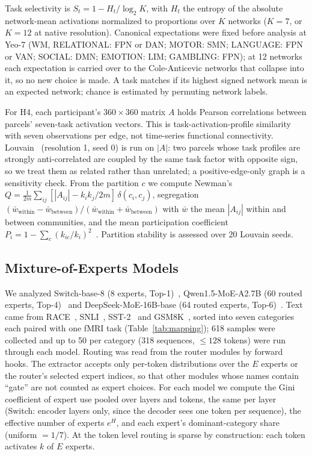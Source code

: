 \documentclass[conference]{IEEEtran}
\begin{document}
Task selectivity is $S_t = 1 - H_t/\log_2 K$, with $H_t$ the entropy of the absolute network-mean activations normalized to proportions over $K$ networks ($K = 7$, or $K = 12$ at native resolution). Canonical expectations were fixed before analysis at Yeo-7 (WM, RELATIONAL: FPN or DAN; MOTOR: SMN; LANGUAGE: FPN or VAN; SOCIAL: DMN; EMOTION: LIM; GAMBLING: FPN); at 12 networks each expectation is carried over to the Cole-Anticevic networks that collapse into it, so no new choice is made. A task matches if its highest signed network mean is an expected network; chance is estimated by permuting network labels.

For H4, each participant's $360 \times 360$ matrix $A$ holds Pearson correlations between parcels' seven-task activation vectors. This is task-activation-profile similarity with seven observations per edge, not time-series functional connectivity. Louvain~\cite{blondel2008fast} (resolution 1, seed 0) is run on $|A|$: two parcels whose task profiles are strongly anti-correlated are coupled by the same task factor with opposite sign, so we treat them as related rather than unrelated; a positive-edge-only graph is a sensitivity check. From the partition $c$ we compute Newman's $Q = \frac{1}{2m}\sum_{ij}[|A_{ij}| - k_ik_j/2m]\,\delta(c_i,c_j)$, segregation $(\bar w_{\mathrm{within}} - \bar w_{\mathrm{between}})/(\bar w_{\mathrm{within}} + \bar w_{\mathrm{between}})$ with $\bar w$ the mean $|A_{ij}|$ within and between communities, and the mean participation coefficient $P_i = 1 - \sum_c (k_{ic}/k_i)^2$~\cite{guimera2005functional}. Partition stability is assessed over 20 Louvain seeds.

\subsection{Mixture-of-Experts Models}

We analyzed Switch-base-8 (8 experts, Top-1)~\cite{fedus2022switch}, Qwen1.5-MoE-A2.7B (60 routed experts, Top-4)~\cite{bai2023qwen} and DeepSeek-MoE-16B-base (64 routed experts, Top-6)~\cite{dai2024deepseekmoe}. Text came from RACE~\cite{lai2017race}, SNLI~\cite{bowman2015large}, SST-2~\cite{socher2013recursive} and GSM8K~\cite{cobbe2021training}, sorted into seven categories each paired with one fMRI task (Table~\ref{tab:mapping}); 618 samples were collected and up to 50 per category (318 sequences, $\le 128$ tokens) were run through each model. Routing was read from the router modules by forward hooks. The extractor accepts only per-token distributions over the $E$ experts or the router's selected expert indices, so that other modules whose names contain ``gate'' are not counted as expert choices. For each model we compute the Gini coefficient of expert use pooled over layers and tokens, the same per layer (Switch: encoder layers only, since the decoder sees one token per sequence), the effective number of experts $e^{H}$, and each expert's dominant-category share (uniform $= 1/7$). At the token level routing is sparse by construction: each token activates $k$ of $E$ experts.
\end{document}
